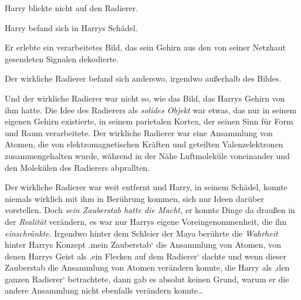 Harry blickte nicht auf den Radierer.

Harry befand sich in Harrys Schädel.

Er erlebte ein verarbeitetes Bild, das sein Gehirn aus den von seiner Netzhaut gesendeten Signalen dekodierte.

Der wirkliche Radierer befand sich anderswo, irgendwo außerhalb des Bildes.

Und der wirkliche Radierer war nicht so, wie das Bild, das Harrys Gehirn von ihm hatte. Die Idee des Radierers als \emph{solides Objekt} war etwas, das nur in seinem eigenen Gehirn existierte, in seinem parietalen Kortex, der seinen Sinn für Form und Raum verarbeitete. Der wirkliche Radierer war eine Ansammlung von Atomen, die von elektromagnetischen Kräften und geteilten Valenzelektronen zusammengehalten wurde, während in der Nähe Luftmoleküle voneinander und den Molekülen des Radierers abprallten.

Der wirkliche Radierer war weit entfernt und Harry, in seinem Schädel, konnte niemals wirklich mit ihm in Berührung kommen, sich nur Ideen darüber vorstellen. Doch \emph{sein Zauberstab hatte die Macht,} er konnte Dinge da draußen in der \emph{Realität} verändern, es war nur Harrys eigene Voreingenommenheit, die ihn \emph{einschränkte}. Irgendwo hinter dem Schleier der Maya berührte die \emph{Wahrheit} hinter Harrys Konzept ‚mein Zauberstab‘ die Ansammlung von Atomen, von denen Harrys Geist als ‚ein Flecken auf dem Radierer‘ dachte und wenn dieser Zauberstab die Ansammlung von Atomen verändern konnte, die Harry als ‚den ganzen Radierer‘ betrachtete, dann gab es absolut keinen Grund, warum er die andere Ansammlung nicht ebenfalls verändern konnte…


